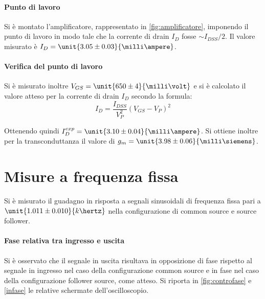 \documentclass[10pt,a4paper]{article}
\begin{document}
\paragraph{Punto di lavoro} Si è montato l'amplificatore, rappresentato in \figurename{\ref{fig:amplificatore}}, imponendo il punto di lavoro in modo tale che la corrente di drain $I_D$ fosse $\sim I_{DSS}/2$. Il valore misurato è $I_D = \unit{3.05 \pm 0.03}{\milli\ampere}$.


\paragraph{Verifica del punto di lavoro} Si è misurato inoltre $V_{GS} = \unit{650 \pm 4}{\milli\volt}$ e si è calcolato il valore atteso per la corrente di drain $I_D$ secondo la formula:
\begin{equation*}
I_D = \frac{I_{DSS}}{V_P^2}(V_{GS} - V_P)^2
\end{equation*}

Ottenendo quindi $I_D^{exp} = \unit{3.10 \pm 0.04}{\milli\ampere}$. Si ottiene inoltre per la transconduttanza il valore di $g_m = \unit{3.98 \pm 0.06}{\milli\siemens}$.

\section{Misure a frequenza fissa}

Si è misurato il guadagno in risposta a segnali sinusoidali di frequenza fissa pari a $\unit{1.011 \pm 0.010}{k\hertz}$ nella configurazione di common source e source follower.

\paragraph{Fase relativa tra ingresso e uscita} Si è osservato che il segnale in uscita risultava in opposizione di fase rispetto al segnale in ingresso nel caso della configurazione common source e in fase nel caso della configurazione follower source, come atteso. Si riporta in \figurename{\ref{fig:controfase}} e \figurename{\ref{infase}} le relative schermate dell'oscilloscopio.
\end{document}

